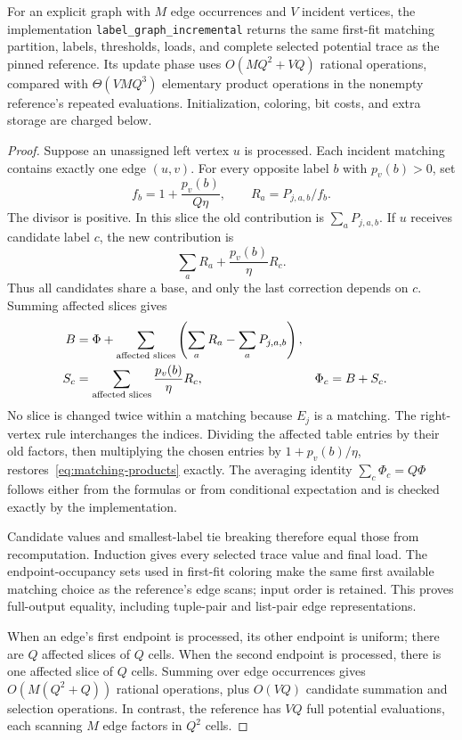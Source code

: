 \begin{theorem}\label{thm:matching}
For an explicit graph with $M$ edge occurrences and $V$ incident vertices,
the implementation \texttt{label\_graph\_incremental} returns the same
first-fit matching partition, labels, thresholds, loads, and complete selected
potential trace as the pinned reference. Its update phase uses
$O(MQ^2+VQ)$ rational operations, compared with $\Theta(VMQ^3)$ elementary
product operations in the nonempty reference's repeated evaluations.
Initialization, coloring, bit costs, and extra storage are charged below.
\end{theorem}
\begin{proof}
Suppose an unassigned left vertex $u$ is processed. Each incident matching
contains exactly one edge $(u,v)$. For every opposite label $b$ with
$p_v(b)>0$, set
\[
 f_b=1+\frac{p_v(b)}{Q\eta},\qquad R_a=P_{j,a,b}/f_b.
\]
The divisor is positive. In this slice the old contribution is
$\sum_aP_{j,a,b}$. If $u$ receives candidate label $c$, the new contribution is
\[
 \sum_aR_a+\frac{p_v(b)}\eta R_c.
\]
Thus all candidates share a base, and only the last correction depends on
$c$. Summing affected slices gives
\begin{align}
 B&=\Phi+\sum_{\text{affected slices}}
          \left(\sum_aR_a-\sum_aP_{j,a,b}\right),\notag\\
 S_c&=\sum_{\text{affected slices}}\frac{p_v(b)}\eta R_c,
 &\Phi_c&=B+S_c.\label{eq:matching-update}
\end{align}
No slice is changed twice within a matching because $E_j$ is a matching.
The right-vertex rule interchanges the indices. Dividing the affected table
entries by their old factors, then multiplying the chosen entries by
$1+p_v(b)/\eta$, restores~\eqref{eq:matching-products} exactly. The averaging
identity $\sum_c\Phi_c=Q\Phi$ follows either from the formulas or from
conditional expectation and is checked exactly by the implementation.

Candidate values and smallest-label tie breaking therefore equal those from
recomputation. Induction gives every selected trace value and final load.
The endpoint-occupancy sets used in first-fit coloring make the same first
available matching choice as the reference's edge scans; input order is
retained. This proves full-output equality, including tuple-pair and list-pair
edge representations.

When an edge's first endpoint is processed, its other endpoint is uniform;
there are $Q$ affected slices of $Q$ cells. When the second endpoint is
processed, there is one affected slice of $Q$ cells. Summing over edge
occurrences gives $O(M(Q^2+Q))$ rational operations, plus $O(VQ)$ candidate
summation and selection operations. In contrast, the reference has $VQ$
full potential evaluations, each scanning $M$ edge factors in $Q^2$ cells.
\end{proof}

